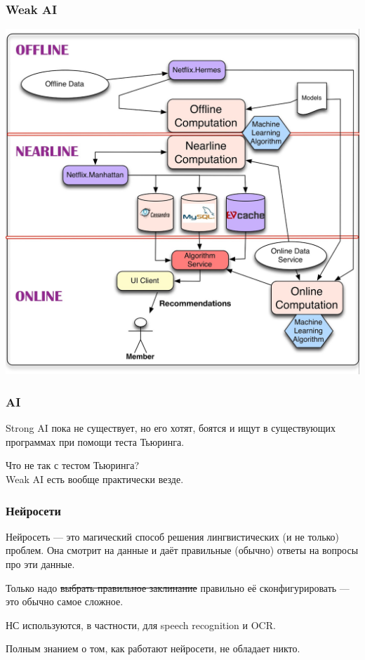 \documentclass[10pt, compress]{beamer}
\begin{document}
\begin{frame}
  \frametitle{Weak AI}
  \begin{center}
  \includegraphics[height=0.9\textheight]{images/netflix.png}
  \end{center}
\end{frame}

\begin{frame}
  \frametitle{AI}
  Strong AI пока не существует, но его хотят, боятся и ищут в существующих программах при помощи теста Тьюринга.

  \alert{Что не так с тестом Тьюринга?}\\
  \vfill
  Weak AI есть вообще практически везде.
\end{frame}

\begin{frame}
  \frametitle{Нейросети}
  Нейросеть --- это магический способ решения лингвистических (и не только) проблем. Она смотрит на данные и даёт правильные (обычно) ответы на вопросы про эти данные.
  
  Только надо \sout{выбрать правильное заклинание} правильно её сконфигурировать --- это обычно самое сложное.
  
  НС используются, в частности, для speech recognition и OCR.
  
  Полным знанием о том, как работают нейросети, не обладает никто.
\end{frame}
\end{document}
